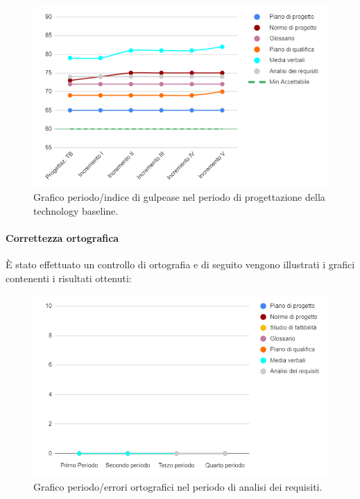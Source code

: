 \begin{figure}[H]
	\centering
	\includegraphics[width=0.8\linewidth]{./res/images/gulpease_2.png}
	\caption{Grafico periodo/indice di gulpease nel periodo di progettazione della technology baseline.}
	\label{fig:Grafico indice di gulpease periodo di progettazione della technology baseline.}
\end{figure}

\paragraph{Correttezza ortografica}
È stato effettuato un controllo di ortografia e di seguito vengono illustrati i grafici contenenti i risultati ottenuti:

\begin{figure}[H]
	\centering
	\includegraphics[width=0.8\linewidth]{./res/images/ortografia_1.png}
	\caption{Grafico periodo/errori ortografici nel periodo di analisi dei requisiti.}
	\label{fig:Grafico errori ortografici durante il periodo di analisi dei requisiti.}
\end{figure}


